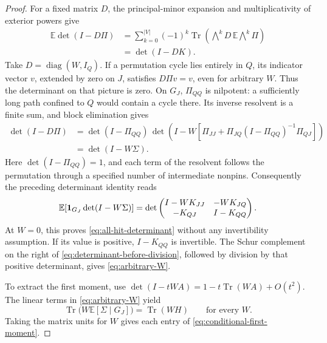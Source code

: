 \begin{proof}
For a fixed matrix \(D\), the principal-minor expansion and
multiplicativity of exterior powers give
\begin{align*}
 \mathbb E\det(I-D\Pi)
 &=\sum_{k=0}^{|V|}(-1)^k
    \operatorname{Tr}\left(\bigwedge\nolimits^kD\,
                         \mathbb E\bigwedge\nolimits^k\Pi\right)\\
 &=\det(I-DK).
\end{align*}
Take \(D=\operatorname{diag}(W,I_Q)\).  If a permutation cycle lies
entirely in \(Q\), its indicator vector \(v\), extended by zero on
\(J\), satisfies \(D\Pi v=v\), even for arbitrary \(W\).
Thus the determinant on that picture is zero.  On \(G_J\),
\(\Pi_{QQ}\) is nilpotent: a sufficiently long path confined to
\(Q\) would contain a cycle there.  Its inverse resolvent is a finite
sum, and block elimination gives
\begin{align*}
 \det(I-D\Pi)
 &=\det(I-\Pi_{QQ})\,
   \det\left(I-W\left[
      \Pi_{JJ}+\Pi_{JQ}(I-\Pi_{QQ})^{-1}\Pi_{QJ}\right]\right)\\
 &=\det(I-W\Sigma).
\end{align*}
Here \(\det(I-\Pi_{QQ})=1\), and each term of the resolvent follows
the permutation through a specified number of intermediate nonpins.
Consequently the preceding determinant identity reads
\begin{equation}
 \mathbb E[\mathbf 1_{G_J}\det(I-W\Sigma)]
   =\det\begin{pmatrix}
      I-WK_{JJ}&-WK_{JQ}\\
      -K_{QJ}&I-K_{QQ}
     \end{pmatrix}.
 \label{eq:determinant-before-division}
\end{equation}
At \(W=0\), this proves \eqref{eq:all-hit-determinant} without any
invertibility assumption.  If its value is positive, \(I-K_{QQ}\)
is invertible.  The Schur complement on the right of
\eqref{eq:determinant-before-division}, followed by division by that
positive determinant, gives \eqref{eq:arbitrary-W}.

To extract the first moment, use
\(\det(I-tWA)=1-t\operatorname{Tr}(WA)+O(t^2)\).
The linear terms in \eqref{eq:arbitrary-W} yield
\[
 \operatorname{Tr}\bigl(W\mathbb E[\Sigma\mid G_J]\bigr)
                 =\operatorname{Tr}(WH)
        \qquad\text{for every }W.
\]
Taking the matrix units for \(W\) gives each entry of
\eqref{eq:conditional-first-moment}.


\end{proof}
